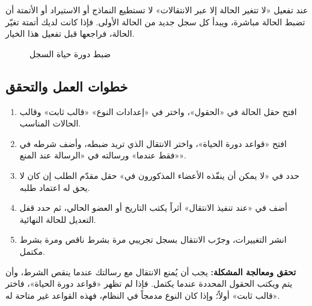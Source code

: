 \begin{rcwarn}
عند تفعيل «لا تتغير الحالة إلا عبر الانتقالات» لا تستطيع النماذج أو الاستيراد أو الأتمتة أن تضبط الحالة مباشرة، ويبدأ كل سجل جديد من الحالة الأولى. فإذا كانت لديك أتمتة تغيّر الحالة، فراجعها قبل تفعيل هذا الخيار.
\end{rcwarn}

\begin{figure}[H]
\centering
{}
\rclegend
\caption{ضبط دورة حياة السجل}
\label{fig:builder-lifecycle-flow}
\end{figure}

\subsection{خطوات العمل والتحقق}
\begin{enumerate}
\item افتح حقل الحالة في «الحقول»، واختر في «إعدادات النوع» «قالب ثابت» وقالب الحالات المناسب.
\item افتح «قواعد دورة الحياة»، واختر الانتقال الذي تريد ضبطه، وأضف شرطه في «فقط عندما» ورسالته في «الرسالة عند المنع».
\item حدد في «لا يمكن أن ينفّذه الأعضاء المذكورون في» حقل مقدّم الطلب إن كان لا يحق له اعتماد طلبه.
\item أضف في «عند تنفيذ الانتقال» أثراً يكتب التاريخ أو العضو الحالي، ثم حدد قفل التعديل للحالة النهائية.
\item انشر التغييرات، وجرّب الانتقال بسجل تجريبي مرة بشرط ناقص ومرة بشرط مكتمل.
\end{enumerate}

\textbf{تحقق ومعالجة المشكلة:} يجب أن يُمنع الانتقال مع رسالتك عندما ينقص الشرط، وأن يتم ويكتب الحقول المحددة عندما يكتمل. فإذا لم تظهر «قواعد دورة الحياة»، فاختر «قالب ثابت» أولاً؛ وإذا كان النوع مدمجاً في النظام، فهذه القواعد غير متاحة له.


